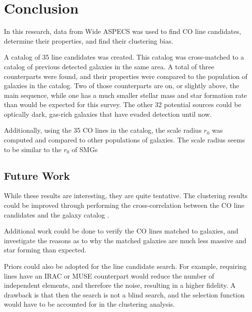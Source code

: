 \documentclass[twoside,single]{lion-msc}
\begin{document}
\chapter{Conclusion}

In this research, data from Wide ASPECS was used to find CO line candidates, determine their properties, and find their clustering bias. 

A catalog of 35 line candidates was created. This catalog was cross-matched to a catalog of previous detected galaxies in the same area. A total of three counterparts were found, and their properties were compared to the population of galaxies in the catalog. Two of those counterparts are on, or slightly above, the main sequence, while one has a much smaller stellar mass and star formation rate than would be expected for this survey. The other 32 potential sources could be optically dark, gas-rich galaxies that have evaded detection until now. 

Additionally, using the 35 CO lines in the catalog, the scale radius $r_0$ was computed and compared to other populations of galaxies. The scale radius seems to be similar to the $r_0$ of SMGs


\section{Future Work}

While these results are interesting, they are quite tentative. The clustering results could be improved through performing the cross-correlation between the CO line candidates and the galaxy catalog \cite{hickox2011clustering, 10.1111/j.1365-2966.2011.20303.x, 10.1111/j.1365-2966.2008.14071.x}. 

Additional work could be done to verify the CO lines matched to galaxies, and investigate the reasons as to why the matched galaxies are much less massive and star forming than expected.

Priors could also be adopted for the line candidate search. For example, requiring lines have an IRAC or MUSE counterpart would reduce the number of independent elements, and therefore the noise, resulting in a higher fidelity. A drawback is that then the search is not a blind search, and the selection function would have to be accounted for in the clustering analysis.

\appendix




\end{document}
